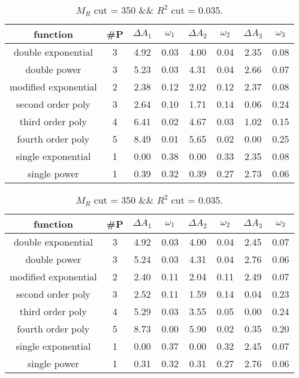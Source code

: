  
\begin{table}[H] 
\begin{center} 
\begin{tabular}{|c|c|cc|cc|cc|} 
\hline function & \#P & $\Delta A_1$ & $\omega_1$ & $\Delta A_2$ & $\omega_2$ & $\Delta A_3$ & $\omega_3$ \\ \hline 
double exponential &  3 &   4.92 &   0.03 &   4.00 &   0.04 &   2.35 &   0.08 \\ 
double power &  3 &   5.23 &   0.03 &   4.31 &   0.04 &   2.66 &   0.07 \\ 
modified exponential &  2 &   2.38 &   0.12 &   2.02 &   0.12 &   2.37 &   0.08 \\ 
second order poly &  3 &   2.64 &   0.10 &   1.71 &   0.14 &   0.06 &   0.24 \\ 
third order poly &  4 &   6.41 &   0.02 &   4.67 &   0.03 &   1.02 &   0.15 \\ 
fourth order poly &  5 &   8.49 &   0.01 &   5.65 &   0.02 &   0.00 &   0.25 \\ 
single exponential &  1 &   0.00 &   0.38 &   0.00 &   0.33 &   2.35 &   0.08 \\ 
single power &  1 &   0.39 &   0.32 &   0.39 &   0.27 &   2.73 &   0.06 \\ 
\hline 
\end{tabular} 
\caption{$M_R$ cut = 350 \&\& $R^2$ cut = 0.035.} 
\label{tab:FitChoices_350_0.035} 
\end{center} 
\end{table} 
 
 
\begin{table}[H] 
\begin{center} 
\begin{tabular}{|c|c|cc|cc|cc|} 
\hline function & \#P & $\Delta A_1$ & $\omega_1$ & $\Delta A_2$ & $\omega_2$ & $\Delta A_3$ & $\omega_3$ \\ \hline 
double exponential &  3 &   4.92 &   0.03 &   4.00 &   0.04 &   2.45 &   0.07 \\ 
double power &  3 &   5.24 &   0.03 &   4.31 &   0.04 &   2.76 &   0.06 \\ 
modified exponential &  2 &   2.40 &   0.11 &   2.04 &   0.11 &   2.49 &   0.07 \\ 
second order poly &  3 &   2.52 &   0.11 &   1.59 &   0.14 &   0.04 &   0.23 \\ 
third order poly &  4 &   5.29 &   0.03 &   3.55 &   0.05 &   0.00 &   0.24 \\ 
fourth order poly &  5 &   8.73 &   0.00 &   5.90 &   0.02 &   0.35 &   0.20 \\ 
single exponential &  1 &   0.00 &   0.37 &   0.00 &   0.32 &   2.45 &   0.07 \\ 
single power &  1 &   0.31 &   0.32 &   0.31 &   0.27 &   2.76 &   0.06 \\ 
\hline 
\end{tabular} 
\caption{$M_R$ cut = 350 \&\& $R^2$ cut = 0.035.} 
\label{tab:FitChoices_350_0.035} 
\end{center} 
\end{table} 
 
 
